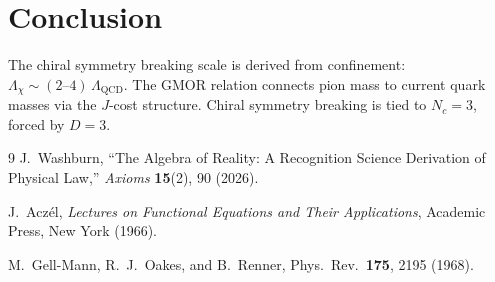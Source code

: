 \documentclass[12pt,a4paper]{article}
\theoremstyle{definition}
\theoremstyle{remark}
\begin{document}
\section{Conclusion}
\label{sec:conclusion}

The chiral symmetry breaking scale is derived from confinement:
$\Lambda_\chi \sim (2\text{--}4)\,\Lambda_{\mathrm{QCD}}$.  The
GMOR relation connects pion mass to current quark masses via the
$J$-cost structure.  Chiral symmetry breaking is tied to $N_c = 3$,
forced by $D = 3$.

\begin{thebibliography}{9}
J.~Washburn, ``The Algebra of Reality: A Recognition Science Derivation
of Physical Law,'' \emph{Axioms} \textbf{15}(2), 90 (2026).

J.~Acz\'el, \textit{Lectures on Functional Equations and Their Applications},
Academic Press, New York (1966).

M.~Gell-Mann, R.~J.~Oakes, and B.~Renner, Phys.\ Rev.\
\textbf{175}, 2195 (1968).
\end{thebibliography}
\end{document}
